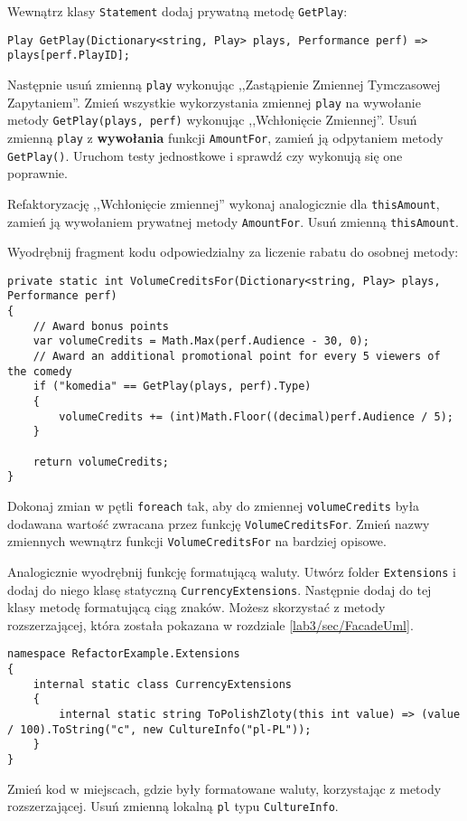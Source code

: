 Wewnątrz klasy \texttt{Statement} dodaj prywatną metodę \texttt{GetPlay}:
\begin{lstlisting}[caption={Dodana metoda \texttt{GetPlay}}]
Play GetPlay(Dictionary<string, Play> plays, Performance perf) => plays[perf.PlayID];
\end{lstlisting}

Następnie usuń zmienną \texttt{play} wykonując ,,Zastąpienie Zmiennej Tymczasowej Zapytaniem''. Zmień wszystkie wykorzystania zmiennej \texttt{play} na wywołanie metody \texttt{GetPlay(plays, perf)} wykonując ,,Wchłonięcie Zmiennej''. Usuń zmienną \texttt{play} z \textbf{wywołania} funkcji \texttt{AmountFor}, zamień ją odpytaniem metody \texttt{GetPlay()}. Uruchom testy jednostkowe i sprawdź czy wykonują się one poprawnie.


Refaktoryzację ,,Wchłonięcie zmiennej'' wykonaj analogicznie dla \texttt{thisAmount}, zamień ją wywołaniem prywatnej metody \texttt{AmountFor}. Usuń zmienną \texttt{thisAmount}.


Wyodrębnij fragment kodu odpowiedzialny za liczenie rabatu do osobnej metody:
\begin{lstlisting}
private static int VolumeCreditsFor(Dictionary<string, Play> plays, Performance perf)
{
	// Award bonus points
	var volumeCredits = Math.Max(perf.Audience - 30, 0);
	// Award an additional promotional point for every 5 viewers of the comedy
	if ("komedia" == GetPlay(plays, perf).Type)
	{
		volumeCredits += (int)Math.Floor((decimal)perf.Audience / 5);
	}
	
	return volumeCredits;
}
\end{lstlisting}
Dokonaj zmian w pętli \texttt{foreach} tak, aby do zmiennej \texttt{volumeCredits} była dodawana wartość zwracana przez funkcję \texttt{VolumeCreditsFor}. Zmień nazwy zmiennych wewnątrz funkcji \texttt{VolumeCreditsFor} na bardziej opisowe. 


Analogicznie wyodrębnij funkcję formatującą waluty. Utwórz folder \texttt{Extensions} i dodaj do niego klasę statyczną \texttt{CurrencyExtensions}. Następnie dodaj do tej klasy metodę formatującą ciąg znaków. Możesz skorzystać z metody rozszerzającej, która została pokazana w rozdziale \ref{lab3/sec/FacadeUml}.
\begin{lstlisting}
namespace RefactorExample.Extensions
{
	internal static class CurrencyExtensions
	{
		internal static string ToPolishZloty(this int value) => (value / 100).ToString("c", new CultureInfo("pl-PL"));
	}
}
\end{lstlisting}
Zmień kod w miejscach, gdzie były formatowane waluty, korzystając z metody rozszerzającej. Usuń zmienną lokalną \texttt{pl} typu \texttt{CultureInfo}. 


